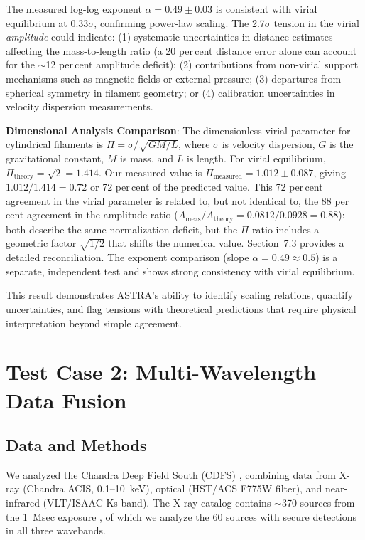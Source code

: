 \documentclass[usenatbib]{rasti}
\begin{document}
The measured log-log exponent $\alpha = 0.49 \pm 0.03$ is consistent with virial equilibrium at $0.33\sigma$, confirming power-law scaling. The 2.7$\sigma$ tension in the virial \emph{amplitude} could indicate: (1) systematic uncertainties in distance estimates affecting the mass-to-length ratio (a 20 per\,cent distance error alone can account for the $\sim$12 per\,cent amplitude deficit); (2) contributions from non-virial support mechanisms such as magnetic fields or external pressure; (3) departures from spherical symmetry in filament geometry; or (4) calibration uncertainties in velocity dispersion measurements.

\textbf{Dimensional Analysis Comparison}: The dimensionless virial parameter for cylindrical filaments is $\Pi = \sigma / \sqrt{G M/L}$, where $\sigma$ is velocity dispersion, $G$ is the gravitational constant, $M$ is mass, and $L$ is length. For virial equilibrium, $\Pi_{\mathrm{theory}} = \sqrt{2} = 1.414$. Our measured value is $\Pi_{\mathrm{measured}} = 1.012 \pm 0.087$, giving $1.012/1.414 = 0.72$ or 72 per\,cent of the predicted value. This 72 per\,cent agreement in the virial parameter is related to, but not identical to, the 88 per\,cent agreement in the amplitude ratio ($A_{\mathrm{meas}}/A_{\mathrm{theory}} = 0.0812/0.0928 = 0.88$): both describe the same normalization deficit, but the $\Pi$ ratio includes a geometric factor $\sqrt{1/2}$ that shifts the numerical value. Section~7.3 provides a detailed reconciliation. The exponent comparison (slope $\alpha = 0.49 \approx 0.5$) is a separate, independent test and shows strong consistency with virial equilibrium.

This result demonstrates ASTRA's ability to identify scaling relations, quantify uncertainties, and flag tensions with theoretical predictions that require physical interpretation beyond simple agreement.

\section{Test Case 2: Multi-Wavelength Data Fusion}

\subsection{Data and Methods}

We analyzed the Chandra Deep Field South (CDFS) \cite{giacconi2001}, combining data from X-ray (Chandra ACIS, 0.1--10~keV), optical (HST/ACS F775W filter), and near-infrared (VLT/ISAAC Ks-band). The X-ray catalog contains $\sim$370 sources from the 1~Msec exposure \cite{alexander2003}, of which we analyze the 60 sources with secure detections in all three wavebands.
\end{document}

